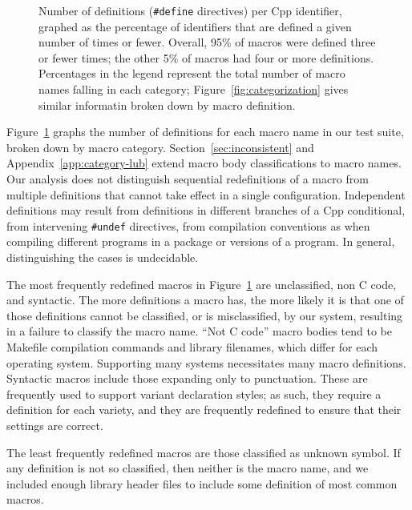 \documentclass[10pt]{article}
\newcommand{\captionsmall}[1]{\caption[]{\small #1}}
\begin{document}
\begin{figure}
\centerline{}
\captionsmall{Number of definitions ({\tt \#define} directives) per Cpp
  identifier, graphed as the percentage of identifiers that are defined a
  given number of times or fewer.  Overall, 95\% of macros were defined
  three or fewer times; the other 5\% of macros had four or more
  definitions.  Percentages in the legend represent the total number of
  macro names falling in each category; Figure~\ref{fig:categorization}
  gives similar informatin broken down by macro definition.}
\label{fig:freq-def-cat}
\end{figure}

Figure~\ref{fig:freq-def-cat} graphs the number of definitions for each
macro name in our test suite, broken down by macro category.
Section~\ref{sec:inconsistent} and Appendix~\ref{app:category-lub} extend
macro body classifications to macro names.  Our analysis does not
distinguish sequential redefinitions of a macro from multiple definitions
that cannot take effect in a single configuration.  Independent definitions
may result from definitions in different branches of a Cpp conditional,
from intervening {\tt \#undef} directives, from compilation conventions as
when compiling different programs in a package or versions of a program.
In general, distinguishing the cases is undecidable.

The most frequently redefined macros in Figure~\ref{fig:freq-def-cat} are
unclassified, non C code, and syntactic.  The more definitions a macro has,
the more likely it is that one of those definitions cannot be classified,
or is misclassified, by our system, resulting in a failure to classify the
macro name.  ``Not C code'' macro bodies tend to be Makefile compilation
commands and library filenames, which differ for each operating system.
Supporting many systems necessitates many macro definitions.  Syntactic
macros include those expanding only to punctuation.  These are frequently
used to support variant declaration styles; as such, they require a
definition for each variety, and they are frequently redefined to ensure
that their settings are correct.

The least frequently redefined macros are those classified as unknown
symbol.  If any definition is not so classified, then neither is the
macro name, and we included enough library header files to include some
definition of most common macros.
\end{document}
